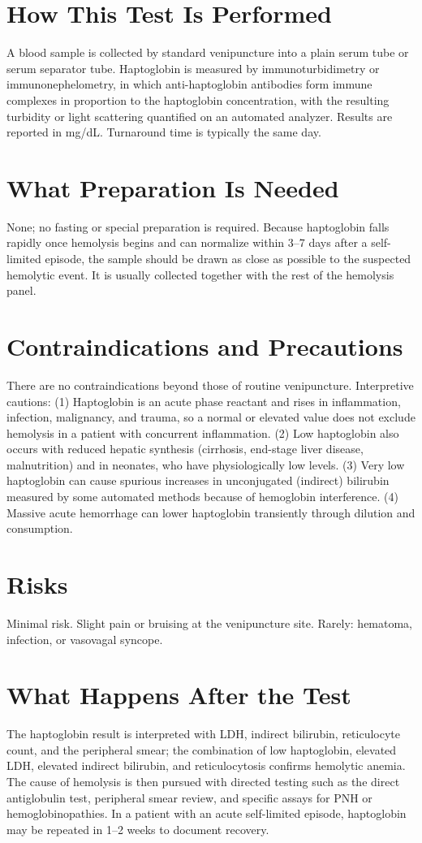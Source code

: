 \section*{How This Test Is Performed}
A blood sample is collected by standard venipuncture into a plain serum tube or serum separator tube. Haptoglobin is measured by immunoturbidimetry or immunonephelometry, in which anti-haptoglobin antibodies form immune complexes in proportion to the haptoglobin concentration, with the resulting turbidity or light scattering quantified on an automated analyzer. Results are reported in mg/dL. Turnaround time is typically the same day.
\section*{What Preparation Is Needed}
None; no fasting or special preparation is required. Because haptoglobin falls rapidly once hemolysis begins and can normalize within 3--7 days after a self-limited episode, the sample should be drawn as close as possible to the suspected hemolytic event. It is usually collected together with the rest of the hemolysis panel.
\section*{Contraindications and Precautions}
There are no contraindications beyond those of routine venipuncture. Interpretive cautions: (1) Haptoglobin is an acute phase reactant and rises in inflammation, infection, malignancy, and trauma, so a normal or elevated value does not exclude hemolysis in a patient with concurrent inflammation. (2) Low haptoglobin also occurs with reduced hepatic synthesis (cirrhosis, end-stage liver disease, malnutrition) and in neonates, who have physiologically low levels. (3) Very low haptoglobin can cause spurious increases in unconjugated (indirect) bilirubin measured by some automated methods because of hemoglobin interference. (4) Massive acute hemorrhage can lower haptoglobin transiently through dilution and consumption.
\section*{Risks}
Minimal risk. Slight pain or bruising at the venipuncture site. Rarely: hematoma, infection, or vasovagal syncope.
\section*{What Happens After the Test}
The haptoglobin result is interpreted with LDH, indirect bilirubin, reticulocyte count, and the peripheral smear; the combination of low haptoglobin, elevated LDH, elevated indirect bilirubin, and reticulocytosis confirms hemolytic anemia. The cause of hemolysis is then pursued with directed testing such as the direct antiglobulin test, peripheral smear review, and specific assays for PNH or hemoglobinopathies. In a patient with an acute self-limited episode, haptoglobin may be repeated in 1--2 weeks to document recovery.

